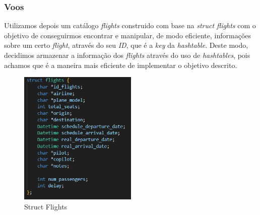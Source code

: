\documentclass[11pt]{article}
\begin{document}
\subsubsection{Voos}
    Utilizamos depois um catálogo \textit{flights} construido
    com base na \textit{struct flights} com o objetivo de conseguirmos encontrar e manipular, de modo eficiente, informações sobre um certo \textit{flight}, através do seu \textit{ID}, que é a \textit{key} da \textit{hashtable}. Deste modo, decidimos armazenar a informação dos \textit{flights} através do uso de \textit{hashtables}, pois achamos que é a maneira mais eficiente de implementar o objetivo descrito.

    \begin{figure}[hbt!]
        \centering
        \includegraphics[width=0.5\textwidth]{flights.png}
        \caption{Struct Flights}
        \label{fig:example}
    \end{figure}
    
\end{document}
